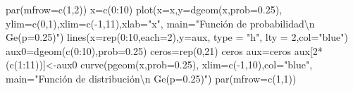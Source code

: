 \documentclass[
  letterpaper,
  DIV=11,
  numbers=noendperiod]{scrreprt}
\newenvironment{Shaded}{\begin{snugshade}}{\end{snugshade}}
\newcommand{\AttributeTok}[1]{\textcolor[rgb]{0.40,0.45,0.13}{#1}}
\newcommand{\DecValTok}[1]{\textcolor[rgb]{0.68,0.00,0.00}{#1}}
\newcommand{\FloatTok}[1]{\textcolor[rgb]{0.68,0.00,0.00}{#1}}
\newcommand{\FunctionTok}[1]{\textcolor[rgb]{0.28,0.35,0.67}{#1}}
\newcommand{\NormalTok}[1]{\textcolor[rgb]{0.00,0.23,0.31}{#1}}
\newcommand{\OtherTok}[1]{\textcolor[rgb]{0.00,0.23,0.31}{#1}}
\newcommand{\SpecialCharTok}[1]{\textcolor[rgb]{0.37,0.37,0.37}{#1}}
\newcommand{\StringTok}[1]{\textcolor[rgb]{0.13,0.47,0.30}{#1}}
\begin{document}
\begin{Shaded}
\begin{Highlighting}[]
\FunctionTok{par}\NormalTok{(}\AttributeTok{mfrow=}\FunctionTok{c}\NormalTok{(}\DecValTok{1}\NormalTok{,}\DecValTok{2}\NormalTok{))}
\NormalTok{x}\OtherTok{=}\FunctionTok{c}\NormalTok{(}\DecValTok{0}\SpecialCharTok{:}\DecValTok{10}\NormalTok{)}
\FunctionTok{plot}\NormalTok{(}\AttributeTok{x=}\NormalTok{x,}\AttributeTok{y=}\FunctionTok{dgeom}\NormalTok{(x,}\AttributeTok{prob=}\FloatTok{0.25}\NormalTok{),}
  \AttributeTok{ylim=}\FunctionTok{c}\NormalTok{(}\DecValTok{0}\NormalTok{,}\DecValTok{1}\NormalTok{),}\AttributeTok{xlim=}\FunctionTok{c}\NormalTok{(}\SpecialCharTok{{-}}\DecValTok{1}\NormalTok{,}\DecValTok{11}\NormalTok{),}\AttributeTok{xlab=}\StringTok{"x"}\NormalTok{,}
  \AttributeTok{main=}\StringTok{"Función de probabilidad}\SpecialCharTok{\textbackslash{}n}\StringTok{ Ge(p=0.25)"}\NormalTok{)}
\FunctionTok{lines}\NormalTok{(}\AttributeTok{x=}\FunctionTok{rep}\NormalTok{(}\DecValTok{0}\SpecialCharTok{:}\DecValTok{10}\NormalTok{,}\AttributeTok{each=}\DecValTok{2}\NormalTok{),}\AttributeTok{y=}\NormalTok{aux, }\AttributeTok{type =} \StringTok{"h"}\NormalTok{, }\AttributeTok{lty =} \DecValTok{2}\NormalTok{,}\AttributeTok{col=}\StringTok{"blue"}\NormalTok{)}
\NormalTok{aux0}\OtherTok{=}\FunctionTok{dgeom}\NormalTok{(}\FunctionTok{c}\NormalTok{(}\DecValTok{0}\SpecialCharTok{:}\DecValTok{10}\NormalTok{),}\AttributeTok{prob=}\FloatTok{0.25}\NormalTok{)}
\NormalTok{ceros}\OtherTok{=}\FunctionTok{rep}\NormalTok{(}\DecValTok{0}\NormalTok{,}\DecValTok{21}\NormalTok{)}
\NormalTok{ceros}
\NormalTok{aux}\OtherTok{=}\NormalTok{ceros}
\NormalTok{aux[}\DecValTok{2}\SpecialCharTok{*}\NormalTok{(}\FunctionTok{c}\NormalTok{(}\DecValTok{1}\SpecialCharTok{:}\DecValTok{11}\NormalTok{))]}\OtherTok{\textless{}{-}}\NormalTok{aux0}
\FunctionTok{curve}\NormalTok{(}\FunctionTok{pgeom}\NormalTok{(x,}\AttributeTok{prob=}\FloatTok{0.25}\NormalTok{),}
  \AttributeTok{xlim=}\FunctionTok{c}\NormalTok{(}\SpecialCharTok{{-}}\DecValTok{1}\NormalTok{,}\DecValTok{10}\NormalTok{),}\AttributeTok{col=}\StringTok{"blue"}\NormalTok{,}
  \AttributeTok{main=}\StringTok{"Función de distribución}\SpecialCharTok{\textbackslash{}n}\StringTok{ Ge(p=0.25)"}\NormalTok{)}
\FunctionTok{par}\NormalTok{(}\AttributeTok{mfrow=}\FunctionTok{c}\NormalTok{(}\DecValTok{1}\NormalTok{,}\DecValTok{1}\NormalTok{))}
\end{Highlighting}
\end{Shaded}
\end{document}
